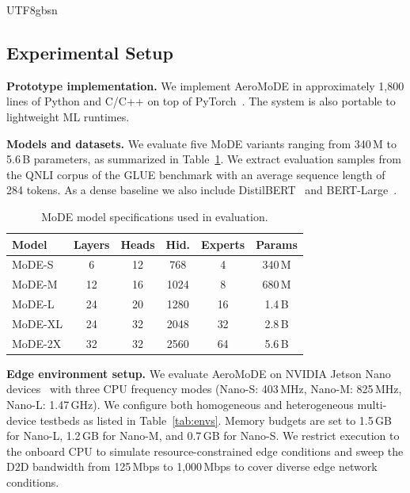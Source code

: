 \documentclass[conference]{IEEEtran}
\begin{document}
\begin{CJK*}{UTF8}{gbsn}
\subsection{Experimental Setup}
\label{sec:setup}

\textbf{Prototype implementation.}
We implement AeroMoDE in approximately 1,800 lines of Python and
C/C++ on top of PyTorch~\cite{pytorch2019}.  The system is also
portable to lightweight ML runtimes.

\textbf{Models and datasets.}
We evaluate five MoDE variants ranging from 340\,M to 5.6\,B
parameters, as summarized in Table~\ref{tab:models}.  We extract
evaluation samples from the QNLI corpus of the GLUE benchmark
\cite{wang2018glue} with an average sequence length of 284 tokens.
As a dense baseline we also include DistilBERT~\cite{sanh2019distilbert}
and BERT-Large~\cite{devlin2018bert}.

\begin{table}[t]
  \caption{MoDE model specifications used in evaluation.}
  \label{tab:models}
  \centering
  \renewcommand{\arraystretch}{1.2}
  \begin{tabular}{lccccc}
    \toprule
    \textbf{Model} & \textbf{Layers} & \textbf{Heads} &
    \textbf{Hid.} & \textbf{Experts} & \textbf{Params} \\
    \midrule
    MoDE-S  & 6  & 12 & 768  & 4  & 340\,M \\
    MoDE-M  & 12 & 16 & 1024 & 8  & 680\,M \\
    MoDE-L  & 24 & 20 & 1280 & 16 & 1.4\,B \\
    MoDE-XL & 24 & 32 & 2048 & 32 & 2.8\,B \\
    MoDE-2X & 32 & 32 & 2560 & 64 & 5.6\,B \\
    \bottomrule
  \end{tabular}
\end{table}

\textbf{Edge environment setup.}
We evaluate AeroMoDE on NVIDIA Jetson Nano devices~\cite{jetson_nano}
with three CPU frequency modes (Nano-S: 403\,MHz, Nano-M: 825\,MHz,
Nano-L: 1.47\,GHz).  We configure both homogeneous and heterogeneous
multi-device testbeds as listed in Table~\ref{tab:envs}.  Memory
budgets are set to 1.5\,GB for Nano-L, 1.2\,GB for Nano-M, and
0.7\,GB for Nano-S.  We restrict execution to the onboard CPU to
simulate resource-constrained edge conditions and sweep the D2D
bandwidth from 125\,Mbps to 1,000\,Mbps to cover diverse edge network
conditions.


\end{CJK*}
\end{document}
